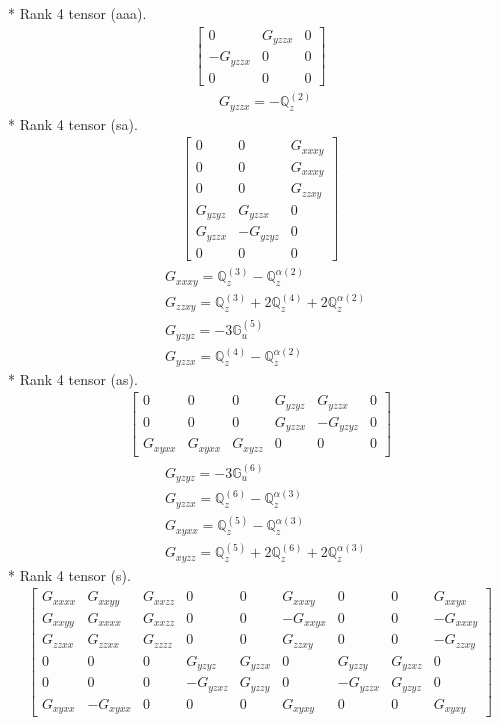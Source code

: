 \documentclass[fleqn,8pt,landscape]{jsarticle}
\begin{document}
* Rank 4 tensor (aaa).
\begin{align*}
\begin{bmatrix} 0 & G_{yzzx} & 0 \\ - G_{yzzx} & 0 & 0 \\ 0 & 0 & 0 \end{bmatrix}
\end{align*}
\begin{align*}
& G_{yzzx} = - \mathbb{Q}_{z}^{(2)}
\end{align*}
* Rank 4 tensor (sa).
\begin{align*}
\begin{bmatrix} 0 & 0 & G_{xxxy} \\ 0 & 0 & G_{xxxy} \\ 0 & 0 & G_{zzxy} \\ G_{yzyz} & G_{yzzx} & 0 \\ G_{yzzx} & - G_{yzyz} & 0 \\ 0 & 0 & 0 \end{bmatrix}
\end{align*}
\begin{align*}
& G_{xxxy} = \mathbb{Q}_{z}^{(3)} - \mathbb{Q}_{z}^{\alpha(2)} \\
& G_{zzxy} = \mathbb{Q}_{z}^{(3)} + 2 \mathbb{Q}_{z}^{(4)} + 2 \mathbb{Q}_{z}^{\alpha(2)} \\
& G_{yzyz} = - 3 \mathbb{G}_{u}^{(5)} \\
& G_{yzzx} = \mathbb{Q}_{z}^{(4)} - \mathbb{Q}_{z}^{\alpha(2)}
\end{align*}
* Rank 4 tensor (as).
\begin{align*}
\begin{bmatrix} 0 & 0 & 0 & G_{yzyz} & G_{yzzx} & 0 \\ 0 & 0 & 0 & G_{yzzx} & - G_{yzyz} & 0 \\ G_{xyxx} & G_{xyxx} & G_{xyzz} & 0 & 0 & 0 \end{bmatrix}
\end{align*}
\begin{align*}
& G_{yzyz} = - 3 \mathbb{G}_{u}^{(6)} \\
& G_{yzzx} = \mathbb{Q}_{z}^{(6)} - \mathbb{Q}_{z}^{\alpha(3)} \\
& G_{xyxx} = \mathbb{Q}_{z}^{(5)} - \mathbb{Q}_{z}^{\alpha(3)} \\
& G_{xyzz} = \mathbb{Q}_{z}^{(5)} + 2 \mathbb{Q}_{z}^{(6)} + 2 \mathbb{Q}_{z}^{\alpha(3)}
\end{align*}
* Rank 4 tensor (s).
\begin{align*}
\begin{bmatrix} G_{xxxx} & G_{xxyy} & G_{xxzz} & 0 & 0 & G_{xxxy} & 0 & 0 & G_{xxyx} \\ G_{xxyy} & G_{xxxx} & G_{xxzz} & 0 & 0 & - G_{xxyx} & 0 & 0 & - G_{xxxy} \\ G_{zzxx} & G_{zzxx} & G_{zzzz} & 0 & 0 & G_{zzxy} & 0 & 0 & - G_{zzxy} \\ 0 & 0 & 0 & G_{yzyz} & G_{yzzx} & 0 & G_{yzzy} & G_{yzxz} & 0 \\ 0 & 0 & 0 & - G_{yzxz} & G_{yzzy} & 0 & - G_{yzzx} & G_{yzyz} & 0 \\ G_{xyxx} & - G_{xyxx} & 0 & 0 & 0 & G_{xyxy} & 0 & 0 & G_{xyxy} \end{bmatrix}
\end{align*}
\end{document}
